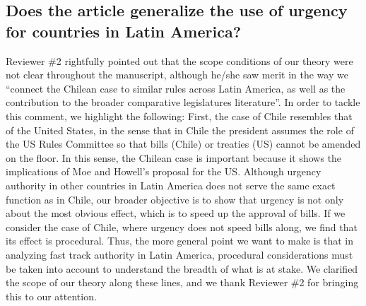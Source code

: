 \documentclass[article,letterpaper,times,12pt,listings-bw,microtype]{article}
\begin{document}
\subsection{Does the article generalize the use of urgency for countries in Latin America? } Reviewer \#2 rightfully pointed out that the scope conditions of our theory were not clear throughout the manuscript, although he/she saw merit in the way we ``connect the Chilean case to similar rules across Latin America, as well as the contribution to the broader comparative legislatures literature''. In order to tackle this comment, we highlight the following: First, the case of Chile resembles that of the United States, in the sense that in Chile the president assumes the role of the US Rules Committee so that bills (Chile) or treaties (US) cannot be amended on the floor. In this sense, the Chilean case is important because it shows the implications of Moe and Howell's proposal for the US. Although urgency authority in other countries in Latin America does not serve the same exact function as in Chile, our broader objective is to show that urgency is not only about the most obvious effect, which is to speed up the approval of bills. If we consider the case of Chile, where urgency does not speed bills along, we find that its effect is procedural. Thus, the more general point we want to make is that in analyzing fast track authority in Latin America, procedural considerations must be taken into account to understand the breadth of what is at stake. We clarified the scope of our theory along these lines, and we thank Reviewer \#2 for bringing this to our attention.
 
 

\end{document}
